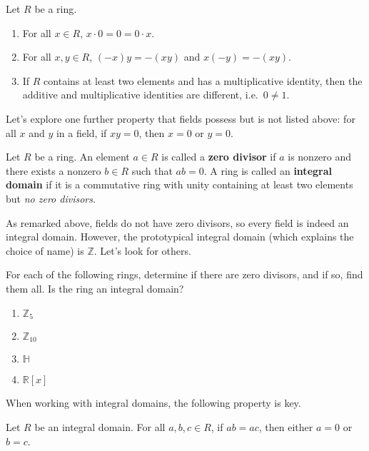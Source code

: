 \begin{fact}
Let $R$ be a ring. 
\begin{enumerate}
\item For all $x\in R$, $x\cdot0 = 0 = 0\cdot x$.
\item For all $x,y\in R$, $(-x)y = -(xy)$ and $x(-y) = -(xy)$.
\item If $R$ contains at least two elements and has a multiplicative identity, then the additive and multiplicative identities are different, i.e.~$0\neq 1$.
\end{enumerate}
\end{fact}

Let's explore one further property that fields possess but is not listed above: for all $x$ and $y$ in a field, if $xy = 0$, then $x=0$ or $y=0$. 

\begin{definition}
Let $R$ be a ring. An element $a\in R$ is called a \textbf{zero divisor} if $a$ is nonzero and there exists a nonzero $b\in R$ such that $ab=0$. A ring is called an  \textbf{integral domain} if it is a commutative ring with unity containing at least two elements but \emph{no zero divisors}.
\end{definition}

As remarked above, fields do not have zero divisors, so every field is indeed an integral domain. However, the prototypical integral domain (which explains the choice of name) is $\mathbb{Z}$. Let's look for others.

\begin{problem}
For each of the following rings, determine if there are zero divisors, and if so, find them all. Is the ring an integral domain?
\begin{multicols}{2}
\begin{enumerate}
\item $\mathbb{Z}_{5}$
\item $\mathbb{Z}_{10}$
\item $\mathbb{H}$
\item $\mathbb{R}[x]$
\end{enumerate}
\end{multicols}
\end{problem}

When working with integral domains, the following property is key.

\begin{theorem}\label{thm.IntegralDomainCancel}
Let $R$ be an integral domain. For all $a,b,c\in R$, if $ab = ac$, then either $a=0$ or $b=c$. 
\end{theorem}

